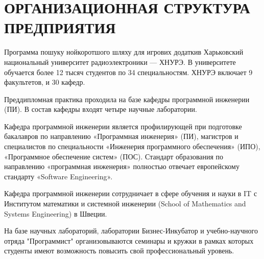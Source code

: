 \section[Организационная структура предприятия]{ОРГАНИЗАЦИОННАЯ СТРУКТУРА ПРЕДПРИЯТИЯ}

\vspace{1\baselineskip} 
Программа пошуку нойкоротшого шляху для игрових додаткив
Харьковский национальный университет радиоэлектроники — ХНУРЭ.
В университете обучается более 12 тысяч студентов по 34 специальностям. ХНУРЭ включает 9 факультетов, и 30 кафедр. 

Преддипломная практика проходила на базе кафедры программной инженерии (ПИ). В состав кафедры входят четыре научные лаборатории.

 Кафедра программной инженерии является профилирующей при подготовке бакалавров по направлению «Программная инженерия» (ПИ), магистров и специалистов по специальности «Инженерия программного обеспечения» (ИПО), «Программное обеспечение систем» (ПОС). Стандарт образования по направлению «программная инженерия» полностью отвечает европейскому стандарту «Software Engineering».

Кафедра программной инженерии сотрудничает в сфере обучения и науки в IT с Институтом математики и системной инженерии (School of Mathematics and Systems Engineering) в Швеции.

На базе научных лабораторий, лаборатории Бизнес-Инкубатор и учебно-научного отряда "Программист" организовываются семинары и кружки в рамках которых студенты имеют возможность повысить свой профессиональный уровень.